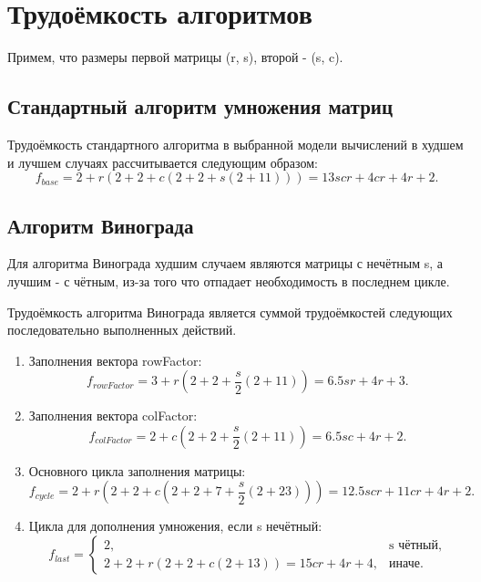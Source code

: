 \documentclass[12pt]{report}
\begin{document}
\section{Трудоёмкость алгоритмов}
Примем, что размеры первой матрицы (r, s), второй - (s, c).
\subsection{Стандартный алгоритм умножения матриц}

Трудоёмкость стандартного алгоритма в выбранной модели вычислений в худшем и лучшем случаях рассчитывается следующим образом:
\begin{equation}
	f_{base} = 2 + r(2 + 2 + c(2 + 2 + s(2 + 11))) = 13scr + 4cr + 4r + 2.
\end{equation}

\subsection{Алгоритм Винограда}
Для алгоритма Винограда худшим случаем являются матрицы с нечётным s, а лучшим - с чётным, из-за того что отпадает необходимость в последнем цикле.

Трудоёмкость алгоритма Винограда является суммой трудоёмкостей следующих последовательно выполненных действий.
\begin{enumerate}
	
	\item Заполнения вектора rowFactor:
	\begin{equation}
	f_{rowFactor} = 3 + r(2 + 2 + \frac{s}{2}(2 + 11)) = 6.5sr + 4r + 3.
	\end{equation}
	
	\item Заполнения вектора colFactor:
	\begin{equation}
	f_{colFactor} = 2 + c(2 + 2 + \frac{s}{2}(2 + 11)) = 6.5sc + 4r + 2.
	\end{equation}
	
	\item Основного цикла заполнения матрицы:
	\begin{equation}
	f_{cycle} = 2 + r(2 + 2 + c(2 + 2 + 7 + \frac{s}{2}(2 + 23))) = 12.5scr + 11cr + 4r + 2.
	\end{equation}
	
	\item Цикла для дополнения умножения, если s нечётный:
	\begin{equation}
	f_{last} = \begin{cases}
	2, & \text{s чётный,}\\
	2 + 2 + r(2 + 2 + c(2 + 13)) = 15cr + 4r + 4, & \text{иначе.}
	\end{cases}
	\end{equation}
\end{enumerate}
\end{document}
